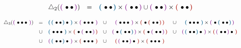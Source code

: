 \documentclass[twoside, 11pt]{amsart}
\theoremstyle{remark}
\begin{document}
\begin{equation*}
  \begin{matrix}
      \triangle_2(\purple{\bullet \bullet}) & = & \blue{\bullet \bullet} \times \purple{\bullet \bullet} \cup \purple{\bullet \bullet} \times \red{\bullet \bullet}
  \end{matrix}
\end{equation*}
\[ \resizebox{\hsize}{!}{$\displaystyle{ 
 \renewcommand*{\arraystretch}{1.5}
  \begin{matrix}
      \triangle_3(\purple{\bullet \bullet \bullet}) 
      & = & \blue{\blue{\bullet \bullet} \bullet} \times \purple{\bullet \bullet \bullet} 
      & \cup & \purple{\bullet \bullet \bullet} \times \red{\bullet \red{\bullet \bullet}}
      & \cup & \blue{\bullet \bullet \bullet} \times \purple{\bullet \blue{\bullet \bullet}} \\
      & \cup & \blue{\bullet \bullet \bullet} \times \red{\bullet \purple{\bullet \bullet}}  
      & \cup & \purple{\bullet \blue{\bullet \bullet}} \times \red{\bullet \purple{\bullet \bullet}} 
      & \cup & \purple{\blue{\bullet \bullet} \bullet} \times \red{\purple{\bullet \bullet} \bullet} \\
      & \cup & \purple{\blue{\bullet \bullet} \bullet} \times \red{\bullet \bullet \bullet} 
      & \cup & \red{\purple{\bullet \bullet} \bullet} \times \red{\bullet \bullet \bullet} 
  \end{matrix} }$} \]
 
\end{document}

